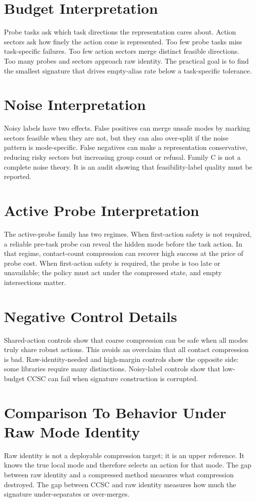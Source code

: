 \documentclass{article}
\begin{document}
\section{Budget Interpretation}
Probe tasks ask which task directions the representation cares about. Action sectors ask how finely the action cone is represented. Too few probe tasks miss task-specific failures. Too few action sectors merge distinct feasible directions. Too many probes and sectors approach raw identity. The practical goal is to find the smallest signature that drives empty-alias rate below a task-specific tolerance.

\section{Noise Interpretation}
Noisy labels have two effects. False positives can merge unsafe modes by marking sectors feasible when they are not, but they can also over-split if the noise pattern is mode-specific. False negatives can make a representation conservative, reducing risky sectors but increasing group count or refusal. Family C is not a complete noise theory. It is an audit showing that feasibility-label quality must be reported.

\section{Active Probe Interpretation}
The active-probe family has two regimes. When first-action safety is not required, a reliable pre-task probe can reveal the hidden mode before the task action. In that regime, contact-count compression can recover high success at the price of probe cost. When first-action safety is required, the probe is too late or unavailable; the policy must act under the compressed state, and empty intersections matter.

\section{Negative Control Details}
Shared-action controls show that coarse compression can be safe when all modes truly share robust actions. This avoids an overclaim that all contact compression is bad. Raw-identity-needed and high-margin controls show the opposite side: some libraries require many distinctions. Noisy-label controls show that low-budget CCSC can fail when signature construction is corrupted.

\section{Comparison To Behavior Under Raw Mode Identity}
Raw identity is not a deployable compression target; it is an upper reference. It knows the true local mode and therefore selects an action for that mode. The gap between raw identity and a compressed method measures what compression destroyed. The gap between CCSC and raw identity measures how much the signature under-separates or over-merges.
\end{document}
